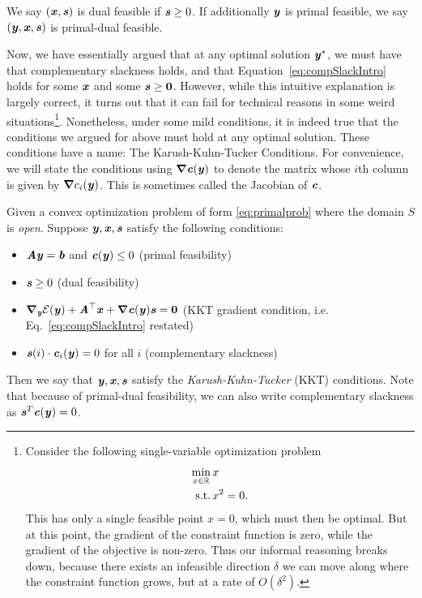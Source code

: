{\begin{definition}
We say $(\xx, \ss)$ is dual feasible if $\ss \geq 0$.
If additionally $\yy$ is primal feasible, we say $(\yy, \xx, \ss)$ is primal-dual feasible.
\end{definition}

Now, we have essentially argued that at any optimal solution
$\yy^*$, we must have that complementary slackness holds, and that
Equation~\eqref{eq:compSlackIntro} holds for some $\xx$ and some $\ss
\geq \veczero$.
However, while this intuitive explanation is largely correct, it turns
out that it can fail for technical reasons in some weird
situations\footnote{
  Consider the following single-variable optimization problem
  \begin{align*}
    \min_{x
    \in \R} &\, x
    \\
    \text{s.t.} & \, x^2 = 0.
  \end{align*}
  This has only a single feasible point $x = 0$, which must then be
  optimal.
  But at this point, the gradient of the constraint function is zero,
  while the gradient of the objective is non-zero.
  Thus our informal reasoning breaks down, because there exists an infeasible
  direction $\delta$ we can move along where the constraint function grows, but
  at a rate of $O(\delta^2)$.
  }.
Nonetheless, under some mild conditions, it is indeed true that the 
conditions we argued for above must hold at any optimal solution.
These conditions have a name: The Karush-Kuhn-Tucker Conditions.
For convenience, we will state the conditions using $\grad \cc(\yy)$
to denote the matrix whose $i$th column is given by $\grad c_i(\yy)$.
This is sometimes called the Jacobian of $\cc$.

\begin{definition}
  Given a convex optimization problem of form
  \eqref{eq:primalprob} where the domain $S$ is \emph{open}.
  Suppose $\yy, \xx, \ss$ satisfy the following conditions:
  \begin{itemize}
  \item $\AA\yy = \bb$ and $\cc(\yy) \leq 0$ \hfill (primal feasibility)
  \item $\ss \geq 0$ \hfill (dual feasibility)
  \item $\grad_{\yy}\calE(\yy) + \AA^\trp\xx +
    \grad\cc(\yy) \ss = \matzero$ \hfill
    (KKT gradient condition, i.e. Eq.~\eqref{eq:compSlackIntro} restated)
  \item $\ss(i)\cdot\cc_i(\yy) = 0$ for all $i$ \hfill (complementary slackness)
  \end{itemize}
  Then we say that $\yy, \xx, \ss$ satisfy the
  \emph{Karush-Kuhn-Tucker} (KKT) conditions.
  Note that because of primal-dual feasibility, we can also write
  complementary slackness as  $\ss^T \cc(\yy)= 0$.
\end{definition}

}
